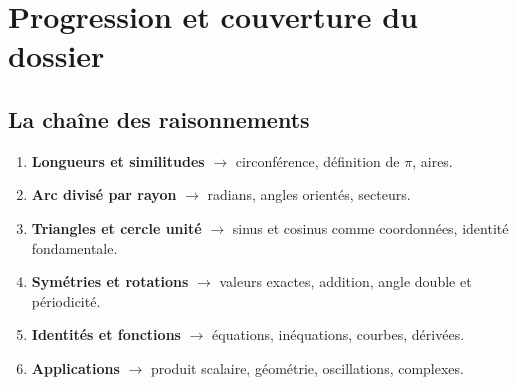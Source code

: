 \documentclass[11pt,a4paper,oneside]{book}
\begin{document}
\chapter{Progression et couverture du dossier}
\section{La chaîne des raisonnements}
\begin{enumerate}
\item \textbf{Longueurs et similitudes} $\longrightarrow$ circonférence, définition de $\pi$, aires.
\item \textbf{Arc divisé par rayon} $\longrightarrow$ radians, angles orientés, secteurs.
\item \textbf{Triangles et cercle unité} $\longrightarrow$ sinus et cosinus comme coordonnées, identité fondamentale.
\item \textbf{Symétries et rotations} $\longrightarrow$ valeurs exactes, addition, angle double et périodicité.
\item \textbf{Identités et fonctions} $\longrightarrow$ équations, inéquations, courbes, dérivées.
\item \textbf{Applications} $\longrightarrow$ produit scalaire, géométrie, oscillations, complexes.
\end{enumerate}
\end{document}
